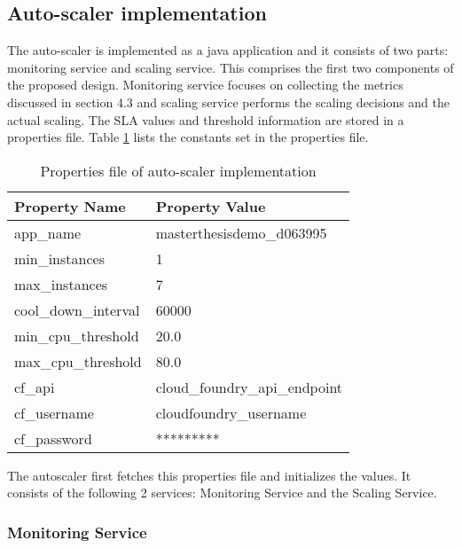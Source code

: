 \documentclass[article,type=msc,colorback,12pt,accentcolor=tud8b,table]{tudthesis}
\begin{document}
	\subsection{Auto-scaler implementation} 
	
	The auto-scaler is implemented as a java application and it consists of two parts: monitoring service and scaling service. This comprises the first two components of the proposed design. Monitoring service focuses on collecting the metrics discussed in section 4.3 and scaling service performs the scaling decisions and the actual scaling. The SLA values and threshold information are stored in a properties file. Table \ref{tab:as_properties} lists the constants set in the properties file. 
	
	\begin{table}[H]
		\centering
		\caption{Properties file of auto-scaler implementation}
		\label{tab:as_properties}
		\begin{tabular}{|l|l|}
			\hline
			\rowcolor[HTML]{EC6500} 
			Property Name        & Property Value                \\ \hline
			app\_name            & masterthesisdemo\_d063995     \\ \hline
			min\_instances       & 1                             \\ \hline
			max\_instances       & 7                             \\ \hline
			cool\_down\_interval & 60000                         \\ \hline
			min\_cpu\_threshold  & 20.0                          \\ \hline
			max\_cpu\_threshold  & 80.0                          \\ \hline
			cf\_api              & cloud\_foundry\_api\_endpoint \\ \hline
			cf\_username         & cloudfoundry\_username           \\ \hline
			cf\_password         & *********                     \\ \hline
		\end{tabular}
	\end{table}
	
	The autoscaler first fetches this properties file and initializes the values. It consists of the following 2 services: Monitoring Service and the Scaling Service. 
	
\subsubsection{Monitoring Service}
	
\end{document}

